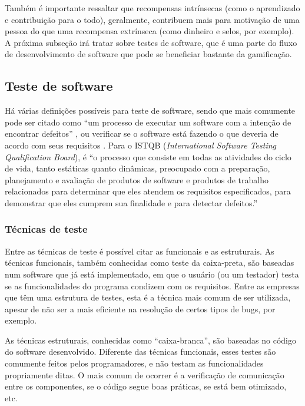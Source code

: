 \documentclass[twoside,english,brazilian]{UNISINOSartigo}
\begin{document}
Também é importante ressaltar que recompensas intrínsecas (como o aprendizado e contribuição para o todo), geralmente, contribuem mais para motivação de uma pessoa do que uma recompensa extrínseca (como dinheiro e selos, por exemplo). A próxima subseção irá tratar sobre testes de software, que é uma parte do fluxo de desenvolvimento de software que pode se beneficiar bastante da gamificação.


\subsection{Teste de software}

Há várias definições possíveis para teste de software, sendo que mais comumente pode ser citado como ``um processo de executar um software com a intenção de encontrar defeitos'' \cite{Myers-1979}, ou verificar se o software está fazendo o que deveria de acordo com seus requisitos \cite{RiosMoreira-2002}. Para o ISTQB (\textit{International Software Testing Qualification Board}), é ``o processo que consiste em todas as atividades do ciclo de vida, tanto estáticas quanto dinâmicas, preocupado com a preparação, planejamento e avaliação de produtos de software e produtos de trabalho relacionados para determinar que eles atendem os requisitos especificados, para demonstrar que eles cumprem sua finalidade e para detectar defeitos.'' \cite{ISTQB-Glos12}

\subsubsection{Técnicas de teste}

Entre as técnicas de teste é possível citar as funcionais e as estruturais. As técnicas funcionais, também conhecidas como teste da caixa-preta, são baseadas num software que já está implementado, em que o usuário (ou um testador) testa se as funcionalidades do programa condizem com os requisitos. Entre as empresas que têm uma estrutura de testes, esta é a técnica mais comum de ser utilizada, apesar de não ser a mais eficiente na resolução de certos tipos de bugs, por exemplo. 

As técnicas estruturais, conhecidas como ``caixa-branca'', são baseadas no código do software desenvolvido. Diferente das técnicas funcionais, esses testes são comumente feitos pelos programadores, e não testam as funcionalidades propriamente ditas. O mais comum de ocorrer é a verificação de comunicação entre os componentes, se o código segue boas práticas, se está bem otimizado, etc.  
\end{document}

